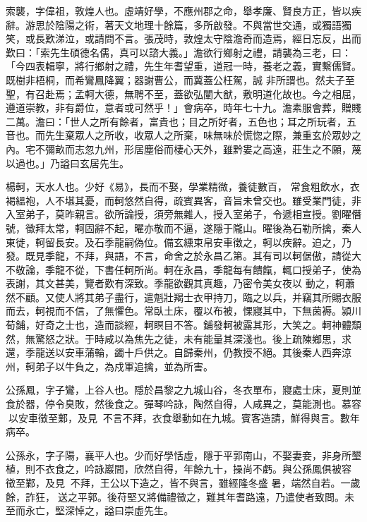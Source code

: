 \begin{pinyinscope}
 索襲，字偉祖，敦煌人也。虛靖好學，不應州郡之命，舉孝廉、賢良方正，皆以疾辭。游思於陰陽之術，著天文地理十餘篇，多所啟發。不與當世交通，或獨語獨笑，或長歎涕泣，或請問不言。張茂時，敦煌太守陰澹奇而造焉，經日忘反，出而歎曰：「索先生碩德名儒，真可以諮大義。」澹欲行鄉射之禮，請襲為三老，曰：「今四表輯寧，將行鄉射之禮，先生年耆望重，道冠一時，養老之義，實繫儒賢。既樹非梧桐，而希鸞鳳降翼；器謝曹公，而冀蓋公枉駕，誠
 非所謂也。然夫子至聖，有召赴焉；孟軻大德，無聘不至，蓋欲弘闡大猷，敷明道化故也。今之相屈，遵道崇教，非有爵位，意者或可然乎！」會病卒，時年七十九。澹素服會葬，贈賤二萬。澹曰：「世人之所有餘者，富貴也；目之所好者，五色也；耳之所玩者，五音也。而先生棄眾人之所收，收眾人之所棄，味無味於慌惚之際，兼重玄於眾妙之內。宅不彌畝而志忽九州，形居塵俗而棲心天外，雖黔婁之高遠，莊生之不願，蔑以過也。」乃謚曰玄居先生。



 楊軻，天水人也。少好《易》，長而不娶，學業精微，養徒數百，
 常食粗飲水，衣褐縕袍，人不堪其憂，而軻悠然自得，疏賓異客，音旨未曾交也。雖受業門徒，非入室弟子，莫昨親言。欲所論授，須旁無雜人，授入室弟子，令遞相宣授。劉曜僭號，徵拜太常，軻固辭不起，曜亦敬而不逼，遂隱于隴山。曜後為石勒所擒，秦人東徙，軻留長安。及石季龍嗣偽位。備玄纁束帛安車徵之，軻以疾辭。迫之，乃發。既見季龍，不拜，與語，不言，命舍之於永昌乙第。其有司以軻倨傲，請從大不敬論，季龍不從，下書任軻所尚。軻在永昌，季龍每有饋餼，輒口授弟子，使為表謝，其文甚美，覽者歎有深致。季龍欲觀其真趣，乃密令美女夜以
 動之，軻蕭然不顧。又使人將其弟子盡行，遣魁壯羯士衣甲持刀，臨之以兵，并竊其所賜衣服而去，軻視而不信，了無懼色。常臥土床，覆以布被，惈寢其中，下無茵褥。潁川荀鋪，好奇之士也，造而談經，軻瞑目不答。鋪發軻被露其形，大笑之。軻神體頹然，無驚怒之狀。于時咸以為焦先之徒，未有能量其深淺也。後上疏陳鄉思，求還，季龍送以安車蒲輪，蠲十戶供之。自歸秦州，仍教授不絕。其後秦人西奔涼州，軻弟子以牛負之，為戍軍追擒，並為所害。



 公孫鳳，字子鸞，上谷人也。隱於昌黎之九城山谷，冬衣單布，寢處士床，夏則並食於器，停令臭敗，然後食之。彈琴吟詠，陶然自得，人咸異之，莫能測也。慕容以安車徵至鄴，及見，不言不拜，衣食舉動如在九城。賓客造請，鮮得與言。數年病卒。



 公孫永，字子陽，襄平人也。少而好學恬虛，隱于平郭南山，不娶妻妾，非身所墾植，則不衣食之，吟詠巖間，欣然自得，年餘九十，操尚不虧。與公孫鳳俱被容徵至鄴，及見，不拜，王公以下造之，皆不與言，雖經隆冬盛
 暑，端然自若。一歲餘，詐狂，送之平郭。後苻堅又將備禮徵之，難其年耆路遠，乃遣使者致問。未至而永亡，堅深悼之，謚曰崇虛先生。




\end{pinyinscope}
